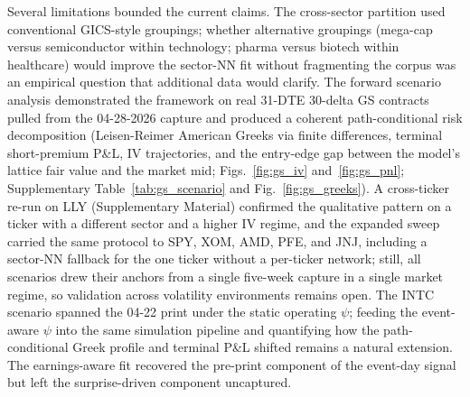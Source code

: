 Several limitations bounded the current claims. The cross-sector partition used conventional GICS-style groupings; whether alternative groupings (mega-cap versus semiconductor within technology; pharma versus biotech within healthcare) would improve the sector-NN fit without fragmenting the corpus was an empirical question that additional data would clarify. The forward scenario analysis demonstrated the framework on real 31-DTE 30-delta GS contracts pulled from the 04-28-2026 capture and produced a coherent path-conditional risk decomposition (Leisen-Reimer American Greeks via finite differences, terminal short-premium P\&L, IV trajectories, and the entry-edge gap between the model's lattice fair value and the market mid; Figs.~\ref{fig:gs_iv} and~\ref{fig:gs_pnl}; Supplementary Table~\ref{tab:gs_scenario} and Fig.~\ref{fig:gs_greeks}). A cross-ticker re-run on LLY (Supplementary Material) confirmed the qualitative pattern on a ticker with a different sector and a higher IV regime, and the expanded sweep carried the same protocol to SPY, XOM, AMD, PFE, and JNJ, including a sector-NN fallback for the one ticker without a per-ticker network; still, all scenarios drew their anchors from a single five-week capture in a single market regime, so validation across volatility environments remains open. The INTC scenario spanned the 04-22 print under the static operating $\psi$; feeding the event-aware $\psi$ into the same simulation pipeline and quantifying how the path-conditional Greek profile and terminal P\&L shifted remains a natural extension. The earnings-aware fit recovered the pre-print component of the event-day signal but left the surprise-driven component uncaptured.


